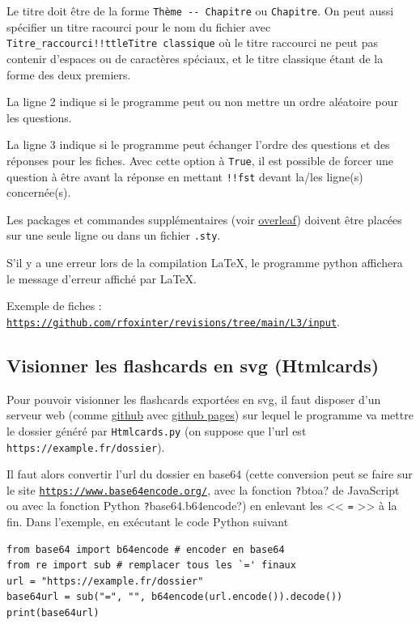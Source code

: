 \documentclass[a4paper,12pt]{article}
\begin{document}
Le titre doit être de la forme \texttt{Thème -{}- Chapitre} ou \texttt{Chapitre}.
On peut aussi spécifier un titre racourci pour le nom du fichier avec \texttt{Titre\_raccourci!!ttleTitre classique} où le titre raccourci ne peut pas contenir d'espaces ou de caractères spéciaux, et le titre classique étant de la forme des deux premiers.

La ligne 2 indique si le programme peut ou non mettre un ordre aléatoire pour les questions.

La ligne 3 indique si le programme peut échanger l'ordre des questions et des réponses pour les fiches. Avec cette option à \texttt{True}, il est possible de forcer une question à être avant la réponse en mettant \texttt{!!fst} devant la/les ligne(s) concernée(s).

Les packages et commandes supplémentaires (voir \href{https://www.overleaf.com/learn/latex/Commands}{overleaf}) doivent être placées sur une seule ligne ou dans un fichier \texttt{.sty}.

S'il y a une erreur lors de la compilation \LaTeX, le programme python affichera le message d'erreur affiché par \LaTeX.

Exemple de fiches : \href{https://github.com/rfoxinter/revisions/tree/main/L3/input}{\texttt{https://github.com/rfoxinter/revisions/tree/main/L3/input}}.
\subsection{Visionner les flashcards en svg (Htmlcards)}
Pour pouvoir visionner les flashcards exportées en svg, il faut disposer d'un serveur web (comme \href{https://github.com/}{github} avec \href{https://pages.github.com/}{github pages}) sur lequel le programme va mettre le dossier généré par \texttt{Htmlcards.py} (on suppose que l'url est \texttt{https://example.fr/dossier}).

Il faut alors convertir l'url du dossier en base64 (cette conversion peut se faire sur le site \href{https://www.base64encode.org/}{\texttt{https://www.base64encode.org/}}, avec la fonction \texttt?btoa? de JavaScript ou avec la  fonction Python \texttt?base64.b64encode?) en enlevant les << \texttt{=} >> à la fin. Dans l'exemple, en exécutant le code Python suivant
\vspace{-\abovedisplayskip}\begin{verbatim}
from base64 import b64encode # encoder en base64
from re import sub # remplacer tous les `=' finaux
url = "https://example.fr/dossier"
base64url = sub("=", "", b64encode(url.encode()).decode())
print(base64url)
\end{verbatim}
\vspace{-\belowdisplayskip}
\end{document}
